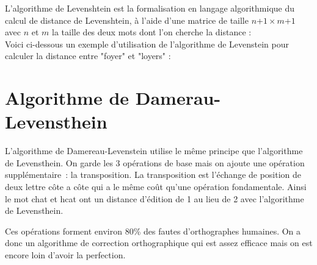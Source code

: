 \documentclass[final, 10pt]{report}
\begin{document}
L'algorithme de Levenshtein est la formalisation en langage algorithmique du calcul de distance de Levenshtein,  à l'aide d'une matrice de taille $n$+$1\times m$+$1$ avec $n$ et $m$ la taille des deux mots dont l'on cherche la distance :\\

Voici ci-dessous un exemple d'utilisation de l'algorithme de Levenstein pour calculer la distance entre "foyer" et "loyers" :\\
\section{Algorithme de Damerau-Levensthein\cite{noauthor_distance_2020}}

    L'algorithme de Damereau-Levenstein utilise le même principe que l'algorithme de Levensthein.
    On garde les 3 opérations de base mais on ajoute une opération supplémentaire~: la transposition.
    La transposition est l'échange de position de deux lettre côte a côte qui a le même coût qu'une opération fondamentale.
    Ainsi le mot \fg chat \og{} et \fg hcat\fg{} ont un distance d'édition de 1 au lieu de 2 avec l'algorithme de Levensthein.
    
    Ces opérations forment environ 80\% des fautes d'orthographes humaines.
    On a donc un algorithme de correction orthographique qui est assez efficace mais on est encore loin d'avoir la perfection.
    
\end{document}
